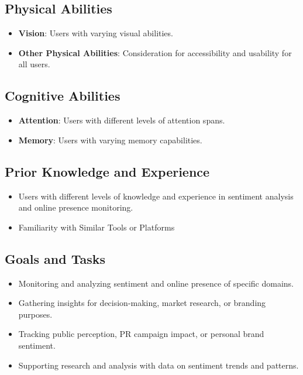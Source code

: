 \documentclass[12pt]{article}
\begin{document}
\subsection{Physical Abilities}
\begin{itemize}
  \item \textbf{Vision}: Users with varying visual abilities.
  \item \textbf{Other Physical Abilities}: Consideration for accessibility and usability for all users.
\end{itemize}

\subsection{Cognitive Abilities}
\begin{itemize}
  \item \textbf{Attention}: Users with different levels of attention spans.
  \item \textbf{Memory}: Users with varying memory capabilities.
\end{itemize}

\subsection{Prior Knowledge and Experience}
\begin{itemize}
  \item Users with different levels of knowledge and experience in sentiment analysis and online presence monitoring.
  \item Familiarity with Similar Tools or Platforms
\end{itemize}

\subsection{Goals and Tasks}
\begin{itemize}
  \item Monitoring and analyzing sentiment and online presence of specific domains.
  \item Gathering insights for decision-making, market research, or branding purposes.
  \item Tracking public perception, PR campaign impact, or personal brand sentiment.
  \item Supporting research and analysis with data on sentiment trends and patterns.
\end{itemize}
\end{document}

